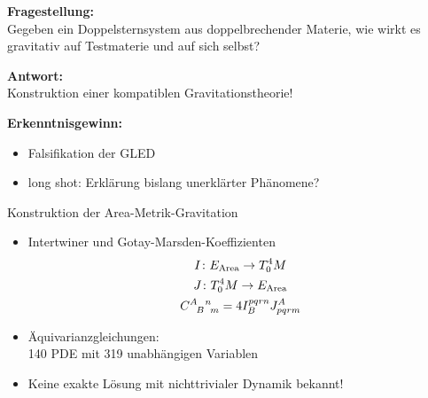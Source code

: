 \documentclass{beamer}
\newcommand{\gmc}[4]{\ensuremath{C^{#1\hphantom{#2}#3}_{\hphantom{#1}{#2}\hphantom{#3}#4}}}
\begin{document}
    \begin{frame}
        \textbf{Fragestellung:} \\
        Gegeben ein Doppelsternsystem aus doppelbrechender Materie, wie wirkt es
        gravitativ auf Testmaterie und auf sich selbst? \pause

        \alert{
            \textbf{Antwort:} \\
            Konstruktion einer kompatiblen Gravitationstheorie!
        } \pause

        \textbf{Erkenntnisgewinn:}
        \begin{itemize}
            \item Falsifikation der GLED
            \item long shot: Erklärung bislang unerklärter Phänomene?
        \end{itemize}
    \end{frame}

    \begin{frame}{Konstruktion der Area-Metrik-Gravitation}
        \begin{itemize}
            \item Intertwiner und Gotay-Marsden-Koeffizienten
            \begin{gather*}
                I \colon E_\text{Area} \rightarrow T^4_0 M \\
                J  \colon T^4_0 M \rightarrow E_\text{Area} \\
                \gmc{A}{B}{n}{m} = 4 I^{pqrn}_B J_{pqrm}^A
            \end{gather*}
            \item Äquivarianzgleichungen: \\
            140 PDE mit 319 unabhängigen Variablen
            \item Keine exakte Lösung mit nichttrivialer Dynamik bekannt!
        \end{itemize}
    \end{frame}
\end{document}
